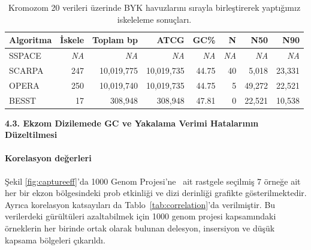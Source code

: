 \documentclass[11pt]{article}
\begin{document}
\begin{table}[htb]
\begin{center}
\begin{tabular}{|l|r|r|r|r|r|r|r}
\hline 
{\bf Algoritma } & {\bf İskele} & {\bf Toplam bp} & {\bf ATCG} & {\bf GC\%} & {\bf N} & {\bf N50} & {\bf N90} \\
\hline
SSPACE &  \textit{NA}  &  \textit{NA}     &     \textit{NA}  &   \textit{NA}   &  \textit{NA}    &  \textit{NA}    &  \textit{NA}   \\
SCARPA &   247	& 10,019,775 &	10,019,735	& 44.75	& 40	& 5,018 &	23,331\\
OPERA  &  250	& 10,019,740	& 10,019,735	& 44.75	& 5	& 49,272	& 22,521 \\
BESST  &  17    & 308,948 & 308,948  & 47.81 & 0  & 22,521 & 10,538 \\ \hline
\end{tabular}
\end{center}
\caption{Kromozom 20 verileri üzerinde BYK havuzlarını sırayla birleştirerek yaptığımız iskeleleme sonuçları.}
\label{tab:chr20h}
\end{table}


\clearpage
\noindent
{\bf \large 4.3. Ekzom Dizilemede GC ve Yakalama Verimi Hatalarının Düzeltilmesi}

\paragraph{Korelasyon değerleri} 

Şekil \ref{fig:captureeff}'da 1000 Genom Projesi'ne~\cite{1000GP2012} ait rastgele seçilmiş 7 örneğe ait her bir ekzon bölgesindeki prob etkinliği ve dizi derinliği grafikte gösterilmektedir. Ayrıca korelasyon katsayıları da Tablo~\ref{tab:correlation}'da verilmiştir. Bu verilerdeki gürültüleri azaltabilmek için 1000 genom projesi kapsamındaki örneklerin her birinde ortak olarak bulunan delesyon, insersiyon ve düşük kapsama bölgeleri çıkarıldı. 
\end{document}

